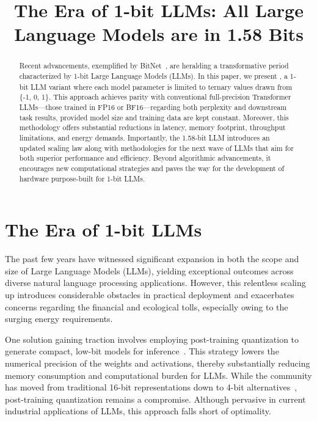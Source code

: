 \title{The Era of 1-bit LLMs: All Large Language Models are in 1.58 Bits}

\begin{abstract}
Recent advancements, exemplified by BitNet~\cite{bitnet}, are heralding a transformative period characterized by 1-bit Large Language Models (LLMs). In this paper, we present \textbf{}, a 1-bit LLM variant where each model parameter is limited to ternary values drawn from \{-1, 0, 1\}. This approach achieves parity with conventional full-precision Transformer LLMs—those trained in FP16 or BF16—regarding both perplexity and downstream task results, provided model size and training data are kept constant. Moreover, this methodology offers substantial reductions in latency, memory footprint, throughput limitations, and energy demands. Importantly, the 1.58-bit LLM introduces an updated scaling law along with methodologies for the next wave of LLMs that aim for both superior performance and efficiency. Beyond algorithmic advancements, it encourages new computational strategies and paves the way for the development of hardware purpose-built for 1-bit LLMs.
\end{abstract}

\section{The Era of 1-bit LLMs}

The past few years have witnessed significant expansion in both the scope and size of Large Language Models (LLMs), yielding exceptional outcomes across diverse natural language processing applications. However, this relentless scaling up introduces considerable obstacles in practical deployment and exacerbates concerns regarding the financial and ecological tolls, especially owing to the surging energy requirements.

One solution gaining traction involves employing post-training quantization to generate compact, low-bit models for inference~\cite{smoothquant, gptq, quip, quip_sharp}. This strategy lowers the numerical precision of the weights and activations, thereby substantially reducing memory consumption and computational burden for LLMs. While the community has moved from traditional 16-bit representations down to 4-bit alternatives~\cite{gptq, awq}, post-training quantization remains a compromise. Although pervasive in current industrial applications of LLMs, this approach falls short of optimality.

